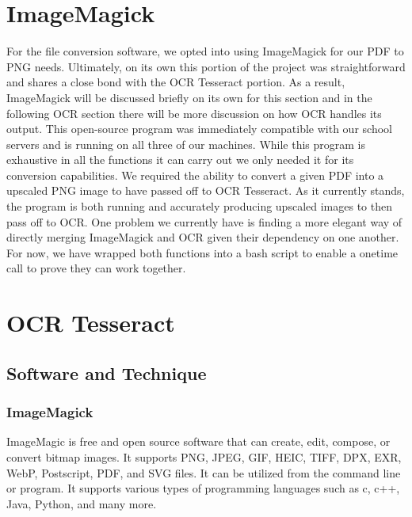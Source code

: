 \documentclass[onecolumn, draftclsnofoot,10pt, compsoc]{IEEEtran}
\begin{document}
\section{ImageMagick}
For the file conversion software, we opted into using ImageMagick for our PDF to PNG needs. Ultimately, on its own this portion of the project was straightforward and shares a close bond with the OCR Tesseract portion. As a result, ImageMagick will be discussed briefly on its own for this section and in the following OCR section there will be more discussion on how OCR handles its output. This open-source program was immediately compatible with our school servers and is running on all three of our machines. While this program is exhaustive in all the functions it can carry out we only needed it for its conversion capabilities. We required the ability to convert a given PDF into a upscaled PNG image to have passed off to OCR Tesseract. As it currently stands, the program is both running and accurately producing upscaled images to then pass off to OCR. One problem we currently have is finding a more elegant way of directly merging ImageMagick and OCR given their dependency on one another. For now, we have wrapped both functions into a bash script to enable a onetime call to prove they can work together.

\section{OCR Tesseract}
\subsection{Software and Technique}
\subsubsection{ImageMagick}
ImageMagic is free and open source software that can create, edit, compose, or convert bitmap images. It supports PNG, JPEG, GIF, HEIC, TIFF, DPX, EXR, WebP, Postscript, PDF, and SVG files. It can be utilized from the command line or program. It supports various types of programming languages such as c, c++, Java, Python, and many more.
\end{document}
